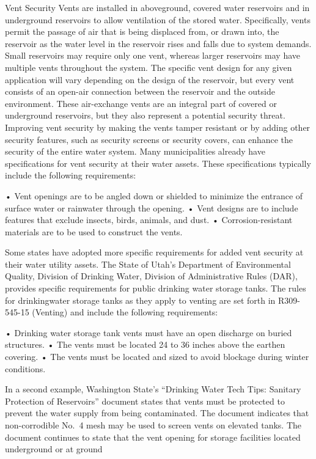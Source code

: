 \documentclass{article}
\begin{document}
Vent Security Vents are installed in aboveground, covered water
reservoirs and in underground reservoirs to allow ventilation of the
stored water. Specifically, vents permit the passage of air that is
being displaced from, or drawn into, the reservoir as the water level in
the reservoir rises and falls due to system demands. Small reservoirs
may require only one vent, whereas larger reservoirs may have multiple
vents throughout the system. The specific vent design for any given
application will vary depending on the design of the reservoir, but
every vent consists of an open-air connection between the reservoir and
the outside environment. These air-exchange vents are an integral part
of covered or underground reservoirs, but they also represent a
potential security threat. Improving vent security by making the vents
tamper resistant or by adding other security features, such as security
screens or security covers, can enhance the security of the entire water
system. Many municipalities already have specifications for vent
security at their water assets. These specifications typically include
the following requirements:

• Vent openings are to be angled down or shielded to minimize the
entrance of surface water or rainwater through the opening. • Vent
designs are to include features that exclude insects, birds, animals,
and dust. • Corrosion-resistant materials are to be used to construct
the vents.

Some states have adopted more specific requirements for added vent
security at their water utility assets. The State of Utah's Department
of Environmental Quality, Division of Drinking Water, Division of
Administrative Rules (DAR), provides specific requirements for public
drinking water storage tanks. The rules for drinkingwater storage tanks
as they apply to venting are set forth in R309-545-15 (Venting) and
include the following requirements:

• Drinking water storage tank vents must have an open discharge on
buried structures. • The vents must be located 24 to 36 inches above the
earthen covering. • The vents must be located and sized to avoid
blockage during winter conditions.

In a second example, Washington State's ``Drinking Water Tech Tips:
Sanitary Protection of Reservoirs'' document states that vents must be
protected to prevent the water supply from being contaminated. The
document indicates that non-corrodible No.~4 mesh may be used to screen
vents on elevated tanks. The document continues to state that the vent
opening for storage facilities located underground or at ground
\end{document}
